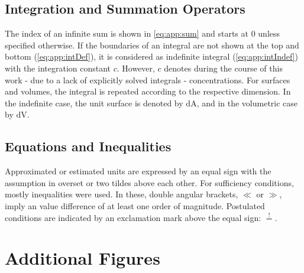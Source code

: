 \subsection{Integration and Summation Operators}
The index of an infinite sum is shown in \cref{eq:app:sum}  and starts at \num{0} unless specified otherwise. If the boundaries of an integral are not shown at the top and bottom (\cref{eq:app:intDef}), it is considered as indefinite integral (\cref{eq:app:intIndef}) with the integration constant $c$. However, $c$ denotes during the course of this work - due to a lack of explicitly solved integrals - concentrations.
For surfaces and volumes, the integral is repeated according to the respective dimension. In the indefinite case, the unit surface is denoted by $\mathrm{dA}$, and in the volumetric case by $\mathrm{dV}$. 

\subsection{Equations and Inequalities}
Approximated or estimated units are expressed by an equal sign with the assumption in overset or two tildes above each other. For sufficiency conditions, mostly inequalities were used. In these, double angular brackets, $\ll$ or $\gg$, imply an value difference of at least one order of magnitude. Postulated conditions are indicated by an exclamation mark above the equal sign: $\overset{!}{=}$.

\clearpage
\section{Additional Figures}
\begin{figure}[h!]
	\centering
	 \hfill 
	\addtocounter{subfigure}{-1}
	\label{fig:fluidic:pumpStability}
\end{figure}


